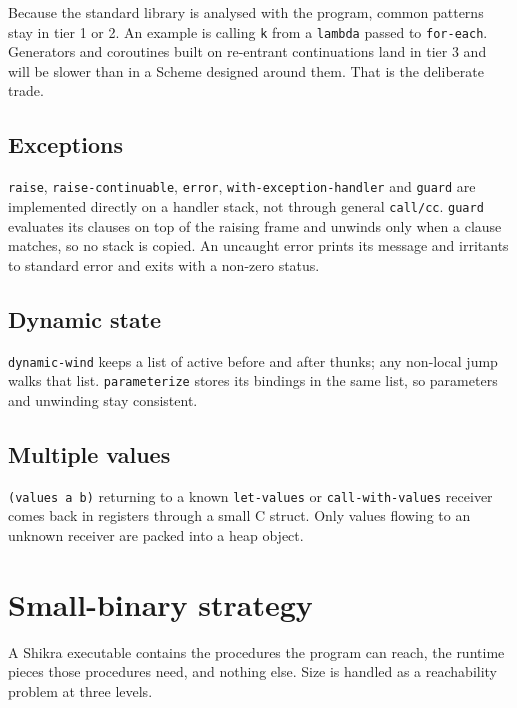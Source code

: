 \documentclass[a4paper,11pt]{article}
\begin{document}
Because the standard library is analysed with the program, common patterns
stay in tier 1 or 2. An example is calling \texttt{k} from a
\texttt{lambda} passed to \texttt{for-each}. Generators and coroutines built
on re-entrant continuations land in tier 3 and will be slower than in a
Scheme designed around them. That is the deliberate trade.

\subsection{Exceptions}

\texttt{raise}, \texttt{raise-continuable}, \texttt{error},
\texttt{with-exception-handler} and \texttt{guard} are implemented directly
on a handler stack, not through general \texttt{call/cc}. \texttt{guard}
evaluates its clauses on top of the raising frame and unwinds only when a
clause matches, so no stack is copied. An uncaught error prints its message
and irritants to standard error and exits with a non-zero status.

\subsection{Dynamic state}

\texttt{dynamic-wind} keeps a list of active before and after thunks; any
non-local jump walks that list. \texttt{parameterize} stores its bindings in
the same list, so parameters and unwinding stay consistent.

\subsection{Multiple values}

\texttt{(values a b)} returning to a known \texttt{let-values} or
\texttt{call-with-values} receiver comes back in registers through a small C
struct. Only values flowing to an unknown receiver are packed into a heap
object.

\section{Small-binary strategy}

A Shikra executable contains the procedures the program can reach, the
runtime pieces those procedures need, and nothing else. Size is handled as a
reachability problem at three levels.
\end{document}
